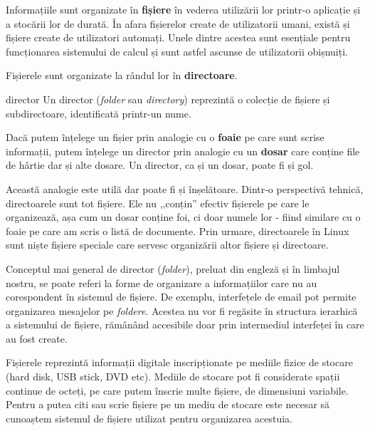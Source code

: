 Informațiile sunt organizate în \textbf{fișiere} în vederea
utilizării lor printr-o aplicație și a stocării lor de durată.
În afara fișierelor create de utilizatorii umani, există și
fișiere create de utilizatori automați. Unele dintre acestea
sunt esențiale pentru funcționarea sistemului de calcul și sunt
astfel ascunse de
utilizatorii obișnuiți.

Fișierele sunt organizate la rândul lor în \textbf{directoare}.

\begin{definition}{director}
Un director (\textit{folder} sau \textit{directory}) reprezintă o colecție de fișiere și subdirectoare, identificată printr-un nume.
\end{definition}

Dacă putem înțelege un fișier prin analogie cu o \textbf{foaie} pe care sunt
scrise informații, putem înțelege un director prin analogie cu un \textbf{dosar}
care conține file de hârtie dar și alte dosare. Un director, ca și un dosar,
poate fi și gol.

Această analogie este utilă dar poate fi și înșelătoare. Dintr-o perspectivă tehnică, directoarele sunt tot fișiere. Ele nu ,,conțin'' efectiv
fișierele pe care le organizează, așa cum un dosar conține foi, ci doar numele
lor - fiind similare cu o foaie pe care am scris o listă de documente. Prin
urmare, directoarele în Linux sunt niște fișiere speciale care servesc
organizării altor fișiere și directoare.

\begin{note}
Conceptul mai general de director (\textit{folder}), preluat din engleză și în limbajul nostru, se
poate referi la forme de organizare a informațiilor care nu au corespondent în
sistemul de fișiere. De exemplu, interfețele de email pot permite organizarea
mesajelor pe \textit{foldere}. Acestea nu vor fi regăsite în structura ierarhică a
sistemului de fișiere, rămânând accesibile doar prin intermediul interfeței în
care au fost create.
\end{note}

Fișierele reprezintă informații digitale inscripționate pe mediile fizice de
stocare (hard disk, USB stick, DVD etc). Mediile de stocare pot fi considerate
spații continue de octeți, pe care putem înscrie multe fișiere, de dimensiuni
variabile. Pentru a putea citi sau scrie fișiere pe un mediu de stocare este
necesar să cunoaștem sistemul de fișiere utilizat pentru organizarea acestuia.

